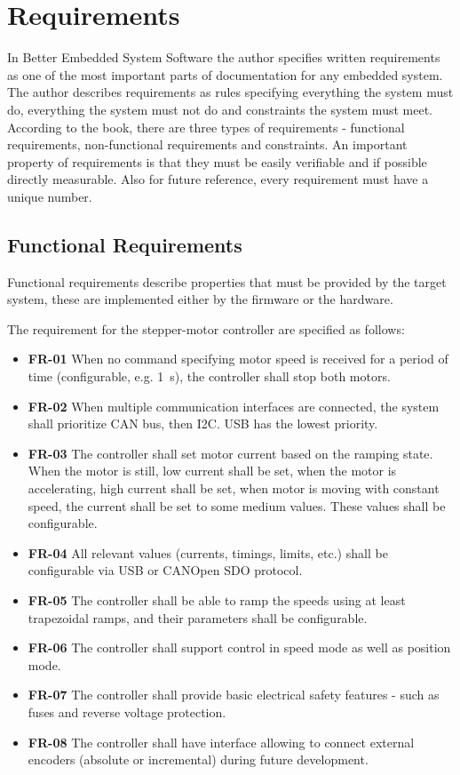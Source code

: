 \section{Requirements}
\label{sec:requirements}
In Better Embedded System Software\cite{phillip_koopman_better_2010} the author specifies written requirements as one of the most important parts of documentation for any embedded system.
The author describes requirements as rules specifying everything the system must do, everything the system must not do and constraints the system must meet.
According to the book, there are three types of requirements - functional requirements, non-functional requirements and constraints.
An important property of requirements is that they must be easily verifiable and if possible directly measurable.
Also for future reference, every requirement must have a unique number.

\subsection{Functional Requirements}
\label{subsec:func_req}
Functional requirements describe properties that must be provided by the target system, these are implemented either by the firmware or the hardware.

The requirement for the stepper-motor controller are specified as follows:

\begin{itemize}
    \item \textbf{FR-01} When no command specifying motor speed is received for a period of time (configurable, e.g. 1~s), the controller shall stop both motors.
    \item \textbf{FR-02} When multiple communication interfaces are connected, the system shall prioritize CAN bus, then I2C. USB has the lowest priority.
    \item \textbf{FR-03} The controller shall set motor current based on the ramping state.
    When the motor is still, low current shall be set, when the motor is accelerating, high current shall be set, when motor is moving with constant speed, the current shall be set to some medium values.
    These values shall be configurable.
    \item \textbf{FR-04} All relevant values (currents, timings, limits, etc.) shall be configurable via USB or CANOpen SDO protocol.
    \item \textbf{FR-05} The controller shall be able to ramp the speeds using at least trapezoidal ramps, and their parameters shall be configurable.
    \item \textbf{FR-06} The controller shall support control in speed mode as well as position mode.
    \item \textbf{FR-07} The controller shall provide basic electrical safety features - such as fuses and reverse voltage protection.
    \item \textbf{FR-08} The controller shall have interface allowing to connect external encoders (absolute or incremental) during future development.
\end{itemize}

